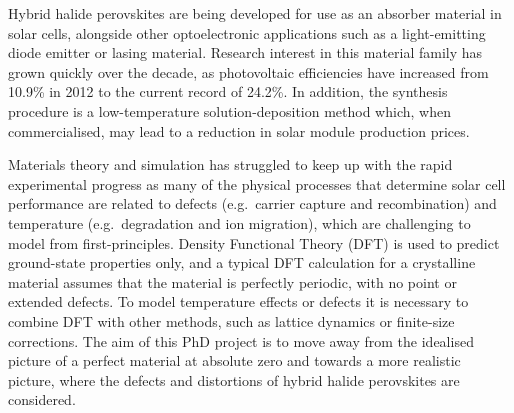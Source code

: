 Hybrid halide perovskites are being developed for use as an absorber material in solar cells, alongside other optoelectronic applications such as a light-emitting diode emitter or lasing material. Research interest in this material family has grown quickly over the decade, as photovoltaic efficiencies have increased from 10.9\% in 2012 to the current record of 24.2\%.  In addition, the synthesis procedure is a low-temperature solution-deposition method which, when commercialised, may lead to a reduction in solar module production prices. 

Materials theory and simulation has struggled to keep up with the rapid experimental progress as many of the physical processes that determine solar cell performance are related to defects (e.g.\ carrier capture and recombination) and temperature (e.g.\ degradation and ion migration), which are challenging to model from first-principles. Density Functional Theory (DFT) is used to predict ground-state properties only, and a typical DFT calculation for a crystalline material assumes that the material is perfectly periodic, with no point or extended defects. To model temperature effects or defects it is necessary to combine DFT with other methods, such as lattice dynamics or finite-size corrections. The aim of this PhD project is to move away from the idealised picture of a perfect material at absolute zero and towards a more realistic picture, where the defects and distortions of hybrid halide perovskites are considered.

